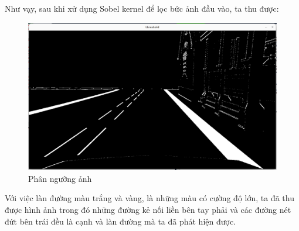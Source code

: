 Như vạy, sau khi xử dụng Sobel kernel để lọc bức ảnh đầu vào, ta thu được:

\begin{figure}[htbp]
    \centering
    \includegraphics[width=0.8\linewidth]{images/3-lane/threshold.png}
    \caption{Phân ngưỡng ảnh}
\end{figure}

Với việc làn đường màu trắng và vàng, là những màu có cường độ lớn, ta đã thu được hình ảnh trong đó những đường kẻ nối liền bên tay phải và các đường nét đứt bên trái đều là cạnh và làn đường mà ta đã phát hiện được.

